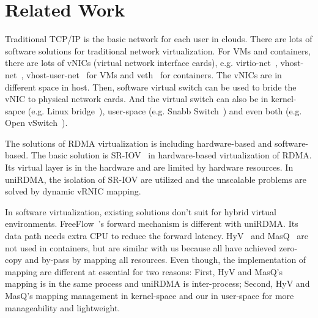 \section{Related Work}

Traditional TCP/IP is the basic network for each user in clouds. There are lots of software solutions for traditional network virtualization. For VMs and containers, there are lots of vNICs (virtual network interface cards), e.g. virtio-net~\cite{virtio-russell2008}, vhost-net~\cite{vhost-net},  vhost-user-net~\cite{vhost-user-net} for VMs and veth~\cite{veth} for containers. The vNICs are in different space in host. Then, software virtual switch can be used to bride the vNIC to physical network cards. And the virtual switch can also be in kernel-sapce (e.g. Linux bridge~\cite{linux-bridge}), user-space (e.g. Snabb Switch~\cite{snabb}) and even both (e.g. Open vSwitch~\cite{ovs-2015}).  

The solutions of RDMA virtualization is including hardware-based and software-based. The basic solution is SR-IOV~\cite{sr-iov} in hardware-based virtualization of RDMA. Its virtual layer is in the hardware and are limited by hardware resources. In uniRDMA, the isolation of SR-IOV are utilized and the unscalable problems are solved by dynamic vRNIC mapping. 

In software virtualization, existing solutions don’t suit for hybrid virtual environments. FreeFlow~\cite{kim2019freeflow}'s forward mechanism is different with uniRDMA. Its data path needs extra CPU to reduce the forward latency. HyV~\cite{pfefferle2015hybrid} and MasQ~\cite{he2020masq} are not used in containers, but are similar with us because all have achieved zero-copy and by-pass by mapping all resources. Even though, the implementation of mapping are different at essential for two reasons: First, HyV and MasQ's mapping is in the same process and uniRDMA is inter-process; Second, HyV and MasQ's mapping management in kernel-space and our in user-space for more manageability and lightweight.
